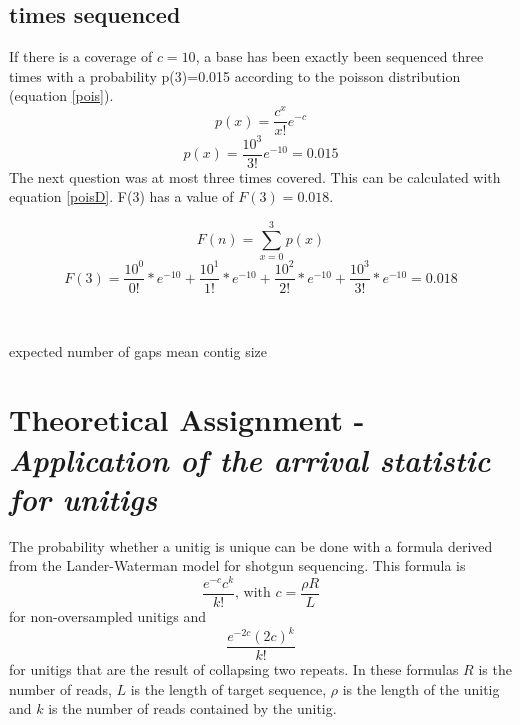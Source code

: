 \documentclass[%
   10pt,              %
   ngerman,           %
   a4paper,           %
   DIV11,             %
]{scrartcl}%
\begin{document}
\subsection{times sequenced}
If there is a coverage of $c=10$, a base has been exactly been sequenced three times with a probability p(3)=0.015 according to the poisson distribution (equation \ref{pois}).
\\
\begin{equation}
p(x)=\frac{c^x}{x!} e^{-c} \label{pois}
\end{equation}
\begin{equation}
p(x)=\frac{10^3}{3!} e^{-10} = 0.015
\end{equation}
The next question was at most three times covered. This can be calculated with equation \ref{poisD}. F(3) has a value of $F(3)=0.018$.

\begin{equation}
	F(n)= \sum_{x=0}^{3} p(x) \label{poisD}	
\end{equation}
\begin{equation}
	F(3)= \frac{10^0}{0!}*e^{-10}+\frac{10^1}{1!}*e^{-10}+\frac{10^2}{2!}*e^{-10}+\frac{10^3}{3!}*e^{-10} = 0.018 \label{poisD}	
\end{equation}
\\
\subsection{}
expected number of gaps
mean contig size
\\
\section{Theoretical Assignment - \textit{Application of the arrival statistic for unitigs}}

The probability whether a unitig is unique can be done with a formula derived from the Lander-Waterman 
model for shotgun sequencing. This formula is
\begin{equation}
 \frac{e^{-c} c^k}{k!}\text{, with } c = \frac{\rho R}{L} \nonumber
\end{equation}
for non-oversampled unitigs and
\begin{equation}
 \frac{e^{-2c} (2c)^k}{k!} \nonumber
\end{equation}
for unitigs that are the result of collapsing two repeats. In these formulas $R$ is the number of reads, $L$ is the length 
of target sequence, $\rho$ is the length of the unitig and $k$ is the number of reads contained by the 
unitig.
\end{document}

